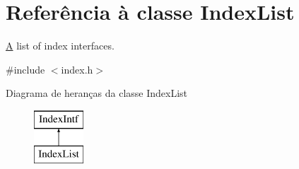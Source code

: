 \hypertarget{class_index_list}{\section{Referência à classe Index\-List}
\label{class_index_list}
}


\hyperlink{class_a}{A} list of index interfaces.  




{\ttfamily \#include $<$index.\-h$>$}

Diagrama de heranças da classe Index\-List\begin{figure}[H]
\begin{center}
\leavevmode
\includegraphics[height=2.000000cm]{class_index_list}
\end{center}
\end{figure}

